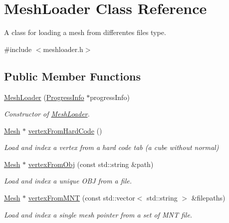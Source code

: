 \hypertarget{class_mesh_loader}{}\section{Mesh\+Loader Class Reference}
\label{class_mesh_loader}


A class for loading a mesh from differentes files type.  




{\ttfamily \#include $<$meshloader.\+h$>$}

\subsection*{Public Member Functions}
\begin{DoxyCompactItemize}
\item 
\mbox{\hyperlink{class_mesh_loader_aa7c21b2f7397722bf822110594c6dea8}{Mesh\+Loader}} (\mbox{\hyperlink{class_progress_info}{Progress\+Info}} $\ast$progress\+Info)
\begin{DoxyCompactList}\small\item\em Constructor of \mbox{\hyperlink{class_mesh_loader}{Mesh\+Loader}}. \end{DoxyCompactList}\item 
\mbox{\hyperlink{class_mesh}{Mesh}} $\ast$ \mbox{\hyperlink{class_mesh_loader_a5cb576ef3e8a00523eda848adf534536}{vertex\+From\+Hard\+Code}} ()
\begin{DoxyCompactList}\small\item\em Load and index a vertex from a hard code tab (a cube without normal) \end{DoxyCompactList}\item 
\mbox{\hyperlink{class_mesh}{Mesh}} $\ast$ \mbox{\hyperlink{class_mesh_loader_ab37469a7143396dbf289ffa7e562a619}{vertex\+From\+Obj}} (const std\+::string \&path)
\begin{DoxyCompactList}\small\item\em Load and index a unique O\+BJ from a file. \end{DoxyCompactList}\item 
\mbox{\hyperlink{class_mesh}{Mesh}} $\ast$ \mbox{\hyperlink{class_mesh_loader_a480cef9886e962a9e63e4630d6341254}{vertex\+From\+M\+NT}} (const std\+::vector$<$ std\+::string $>$ \&filepaths)
\begin{DoxyCompactList}\small\item\em Load and index a single mesh pointer from a set of M\+NT file. \end{DoxyCompactList}\end{DoxyCompactItemize}


